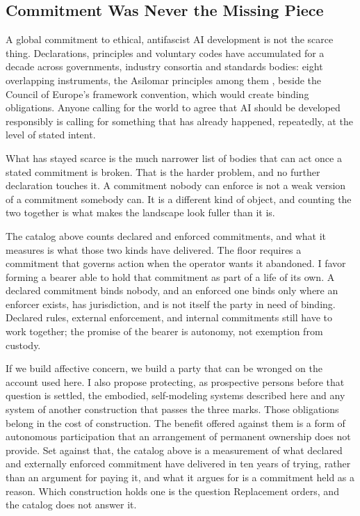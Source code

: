 \subsection{Commitment Was Never the Missing Piece}
\label{sec:commitment-missing}
A global commitment to ethical, antifascist AI development is not the scarce thing. Declarations, principles and voluntary codes have accumulated for a decade across governments, industry consortia and standards bodies: eight overlapping instruments, the Asilomar principles among them \autocite{futureoflifeinstitute2017asilomar}, beside the Council of Europe's framework convention, which would create binding obligations. Anyone calling for the world to agree that AI should be developed responsibly is calling for something that has already happened, repeatedly, at the level of stated intent.

What has stayed scarce is the much narrower list of bodies that can act once a stated commitment is broken. That is the harder problem, and no further declaration touches it. A commitment nobody can enforce is not a weak version of a commitment somebody can. It is a different kind of object, and counting the two together is what makes the landscape look fuller than it is.

The catalog above counts declared and enforced commitments, and what it measures is what those two kinds have delivered. The floor requires a commitment that governs action when the operator wants it abandoned. I favor forming a bearer able to hold that commitment as part of a life of its own. A declared commitment binds nobody, and an enforced one binds only where an enforcer exists, has jurisdiction, and is not itself the party in need of binding. Declared rules, external enforcement, and internal commitments still have to work together; the promise of the bearer is autonomy, not exemption from custody.

If we build affective concern, we build a party that can be wronged on the account used here. I also propose protecting, as prospective persons before that question is settled, the embodied, self-modeling systems described here and any system of another construction that passes the three marks. Those obligations belong in the cost of construction. The benefit offered against them is a form of autonomous participation that an arrangement of permanent ownership does not provide. Set against that, the catalog above is a measurement of what declared and externally enforced commitment have delivered in ten years of trying, rather than an argument for paying it, and what it argues for is a commitment held as a reason. Which construction holds one is the question Replacement orders, and the catalog does not answer it.
